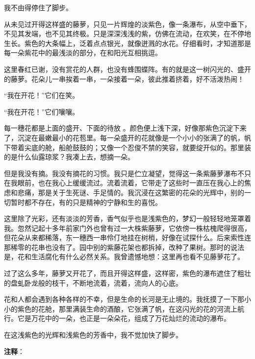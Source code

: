 \documentclass[12pt,UTF-8,openany]{ctexbook}
\begin{document}
\begin{large}
    
    我不由得停住了脚步。
    
    从未见过开得这样盛的藤萝，只见一片辉煌的淡紫色，像一条瀑布，从空中垂下，不见其发端，也不见其终极。只是深深浅浅的紫，仿佛在流动，在欢笑，在不停地生长。紫色的大条幅上，泛着点点银光，就像迸溅的水花。仔细看时，才知道那是每一朵紫花中的最浅淡的部分，在和阳光互相挑逗。
    
    这里春红已谢，没有赏花的人群，也没有蜂围蝶阵。有的就是这一树闪光的、盛开的藤萝。花朵儿一串挨着一串，一朵接着一朵，彼此推着挤着，好不活泼热闹！
    
    “我在开花！”它们在笑。
    
    “我在开花！”它们嚷嚷。
    
    每一穗花都是上面的盛开、下面的待放 。颜色便上浅下深，好像那紫色沉淀下来了，沉淀在最嫩最小的花苞里。每一朵盛开的花就像是一个小小的张满了的帆，帆下带着尖底的舱，船舱鼓鼓的；又像一个忍俊不禁的笑容，就要绽开似的。那里装的是什么仙露琼浆？我凑上去，想摘一朵。
    
    但是我没有摘。我没有摘花的习惯。我只是伫立凝望，觉得这一条紫藤萝瀑布不只在我眼前，也在我心上缓缓流过。流着流着，它带走了这些时一直压在我心上的焦虑和悲痛，那是关于生死谜、手足情的。我沉浸在这繁密的花朵的光辉中，别的一切暂时都不存在，有的只是精神的宁静和生的喜悦。
    
    这里除了光彩，还有淡淡的芳香，香气似乎也是浅紫色的，梦幻一般轻轻地笼罩着我。忽然记起十多年前家门外也曾有过一大株紫藤萝，它依傍一株枯槐爬得很高，但花朵从来都稀落，东一穗西一串伶仃地挂在树梢，好像在试探什么。后来索性连那稀零的花串也没有了。园中别的紫藤花架也都拆掉，改种了果树。那时的说法是，花和生活腐化有什么必然关系。我曾遗憾地想：这里再也看不见藤萝花了。
    
    过了这么多年，藤萝又开花了，而且开得这样盛，这样密，紫色的瀑布遮住了粗壮的盘虬卧龙般的枝干，不断地流着，流着，流向人的心底。
    
    花和人都会遇到各种各样的不幸，但是生命的长河是无止境的。我抚摸了一下那小小的紫色的花舱，那里满装生命的酒酿，它张满了帆，在这闪光的花的河流上航行。它是万花中的一朵，也正是一朵朵花，组成了万花灿烂的流动的瀑布。
    
    在这浅紫色的光辉和浅紫色的芳香中，我不觉加快了脚步。
    
\end{large}


\newpage

\textbf{注释}：

\vspace{-1em}
\end{document}
